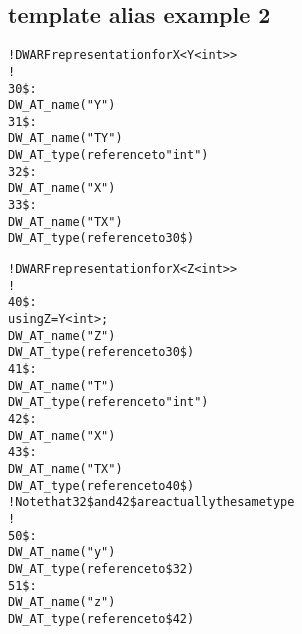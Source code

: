 \subsection{template alias example 2}
\label{app:templatealiasexample2}
\begin{alltt}
! DWARF representation for X<Y<int>>
!
30\$: 
        DW\-\_AT\-\_name("Y")
31\$:   
            DW\-\_AT\-\_name("TY")
            DW\-\_AT\-\_type(reference to "int")
32\$: 
        DW\-\_AT\-\_name("X")
33\$:   
            DW\-\_AT\-\_name("TX")
            DW\-\_AT\-\_type(reference to 30\$)

! DWARF representation for X<Z<int>>
!
40\$: 
using Z = Y<int>;
        DW\-\_AT\-\_name("Z")
        DW\-\_AT\-\_type(reference to 30\$)
41\$:   
            DW\-\_AT\-\_name("T")
            DW\-\_AT\-\_type(reference to "int")
42\$: 
        DW\-\_AT\-\_name("X")
43\$:   
            DW\-\_AT\-\_name("TX")
            DW\-\_AT\-\_type(reference to 40\$)
! Note that 32\$ and 42\$ are actually the same type
!
50\$: 
        DW\-\_AT\-\_name("y")
        DW\-\_AT\-\_type(reference to \$32)
51\$: 
        DW\-\_AT\-\_name("z")
        DW\-\_AT\-\_type(reference to \$42)
\end{alltt}

